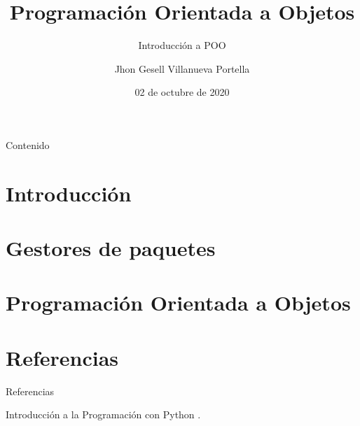 \documentclass[10pt]{beamer}
\author[Jhon]{Jhon Gesell Villanueva Portella\inst{1}}
\title[Sesión 06]{Programación Orientada a Objetos}
\date{02 de octubre de 2020}
\subtitle{Introducción a POO}
\institute[TLS]{
\inst{1}
Tolouse Lautrec.\\
\vspace{2mm}

}
\begin{document}
\begin{frame}
\maketitle
\end{frame}
\begin{frame}{Contenido}
\tableofcontents
\end{frame}
\section{Introducción}

\section{Gestores de paquetes}

\section{Programación Orientada a Objetos}

%
%		



\appendix
\section{Referencias}
\begin{frame}{Referencias}
\begin{thebibliography}{8}

\beamertemplatebookbibitems
Introducción a la Programación con Python
.

\end{thebibliography}
\end{frame}
\end{document}
